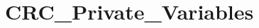 \hypertarget{group___c_r_c___private___variables}{}\section{C\+R\+C\+\_\+\+Private\+\_\+\+Variables}
\label{group___c_r_c___private___variables}
